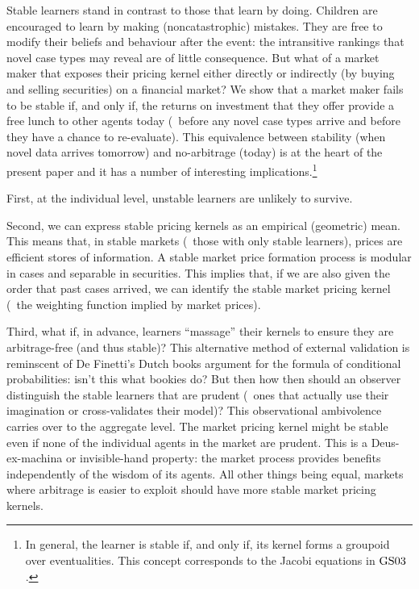 \documentclass[12pt,a4paper,twoside]{article}
\newcommand{\gsii}{$\textup{GS03}$}
\begin{document}

Stable learners stand in contrast to those that learn by doing. Children are
encouraged to learn by making (noncatastrophic) mistakes. They are free to
modify their beliefs and behaviour after the event: the intransitive rankings
that novel case types may reveal \citep{weinstein} are of little consequence.
But what of a market maker that exposes their pricing kernel either directly or
indirectly (by buying and selling securities) on a financial market? We show
that a market maker fails to be stable if, and only if, the returns on
investment that they offer provide a free lunch to other agents today (\ie\
before any novel case types arrive and before they have a chance to
re-evaluate).  This equivalence between stability (when novel data arrives
tomorrow) and no-arbitrage (today) is at the heart of the present paper and it
has a number of interesting implications.\footnote{In general, the learner is
stable if, and only if, its kernel forms a groupoid over eventualities. This
concept corresponds to the Jacobi equations in \gsii.}

First, at the individual level, unstable learners are unlikely to survive.

Second, we can express stable pricing kernels as an empirical (geometric) mean.
This means that, in stable markets (\ie\ those with only stable learners),
prices are efficient stores of information. A stable market price formation
process is modular in cases and separable in securities. This implies that, if
we are also given the order that past cases arrived, we can identify the stable
market pricing kernel (\ie\ the weighting function implied by market prices).
 
Third, what if, in advance, learners ``massage'' their kernels to ensure they
are arbitrage-free (and thus stable)? This alternative method of external
validation is reminscent of De Finetti's Dutch books argument for the formula
of conditional probabilities: isn't this what bookies do?  But then how then
should an observer distinguish the stable learners that are prudent (\ie\ ones
that actually use their imagination or cross-validates their model)?  This
observational ambivolence carries over to the aggregate level.  The market
pricing kernel might be stable even if none of the individual agents in the
market are prudent.  This is a Deus-ex-machina or invisible-hand
property: the market process provides benefits independently of the wisdom of
its agents.  All other things being equal, markets where arbitrage is easier to
exploit should have more stable market pricing kernels.
 
\end{document}
